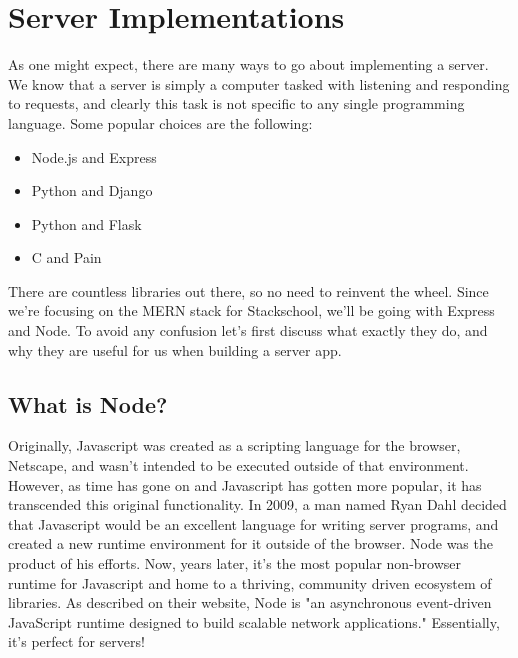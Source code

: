 
\section{Server Implementations}

As one might expect, there are many ways to go about implementing a server. We know that a server is simply a computer tasked with listening and responding to requests, and clearly this task is not specific to any single programming language. Some popular choices are the following:

\begin{itemize}
    \item Node.js and Express
    \item Python and Django
    \item Python and Flask
    \item C and Pain
\end{itemize}

There are countless libraries out there, so no need to reinvent the wheel. Since we're focusing on the MERN stack for Stackschool, we'll be going with Express and Node. To avoid any confusion let's first discuss what exactly they do, and why they are useful for us when building a server app.

\subsection*{What is Node?}

Originally, Javascript was created as a scripting language for the browser, Netscape, and wasn't intended to be executed outside of that environment. However, as time has gone on and Javascript has gotten more popular, it has transcended this original functionality. In 2009, a man named Ryan Dahl decided that Javascript would be an excellent language for writing server programs, and created a new runtime environment for it outside of the browser. Node was the product of his efforts. Now, years later, it's the most popular non-browser runtime for Javascript and home to a thriving, community driven ecosystem of libraries. As described on their website, Node is "an asynchronous event-driven JavaScript runtime designed to build scalable network applications." Essentially, it's perfect for servers!

